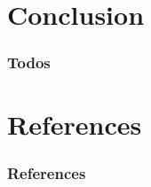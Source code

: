 \documentclass[
	aspectratio=169,
	compress,
]{beamer}
\newcommand{\navframetitle}[1]{\frametitle{#1\hfill{\footnotesize\lastsection{}}}}
\begin{document}
\section{Conclusion}
\label{sec:conclusion}

\begin{frame}
	\navframetitle{Todos}


	\lipsum[1]
\end{frame}

\appendix

\AtBeginSection[]{}
\AtBeginSubsection[]{}

\section{References}

\begin{frame}[allowframebreaks]
	\frametitle{References}

	
	
\end{frame}
\end{document}
